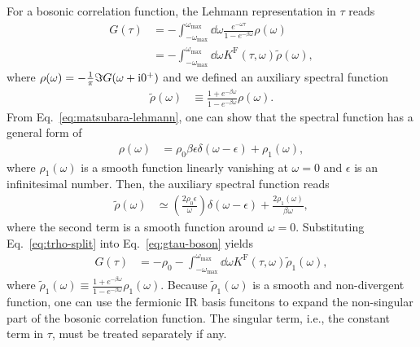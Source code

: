 \documentclass[submission, LectureNotes]{SciPost}
\newcommand{\wmax}{\ensuremath{{\omega_\mathrm{max}}}}
\newcommand\ii{\mathrm{i}}%
\newcommand{\KF}{\ensuremath{K^\mathrm{F}}}
\begin{document}
For a bosonic correlation function, the Lehmann representation in $\tau$ reads
\begin{align}
    G(\tau) &= - \int_{-\wmax}^\wmax \dd \omega \frac{e^{-\omega\tau}}{1-e^{-\beta\omega}} \rho(\omega)\nonumber\\
    &= -  \int_{-\wmax}^\wmax \dd\omega \KF(\tau, \omega) \tilde \rho(\omega),\label{eq:gtau-boson}
\end{align}
where $\rho(\omega) = - \frac{1}{\pi}\imaginary G(\omega+\ii 0^+)$ and we defined an auxiliary spectral function
\begin{align}
    \tilde \rho(\omega) &\equiv \frac{1+e^{-\beta\omega}}{1-e^{-\beta \omega}} \rho(\omega).
\end{align}
From Eq.~\eqref{eq:matsubara-lehmann}, one can show that the spectral function has a general form of
\begin{align}
   \rho(\omega) &= \rho_0\beta\epsilon \delta(\omega - \epsilon) + \rho_1(\omega),\label{eq:rho-split}
\end{align}
where $\rho_1(\omega)$ is a smooth function linearly vanishing at $\omega=0$ and $\epsilon$ is an infinitesimal number.
Then, the auxiliary spectral function reads
\begin{align}
   \tilde \rho(\omega) &\simeq \left(\frac{2\rho_0\epsilon}{\omega}\right) \delta(\omega-\epsilon) + \frac{2\rho_1(\omega)}{\beta\omega},\label{eq:trho-split}
\end{align}
where the second term is a smooth function around $\omega=0$.
Substituting Eq.~\eqref{eq:trho-split} into Eq.~\eqref{eq:gtau-boson} yields
\begin{align}
    G(\tau) &= -\rho_0 - \int_{-\wmax}^\wmax \dd\omega \KF(\tau, \omega) \tilde \rho_1(\omega),\label{eq:gtau-boson-split}
\end{align}
where $\tilde \rho_1(\omega) \equiv \frac{1+e^{-\beta\omega}}{1-e^{-\beta\omega}} \rho_1(\omega)$.
Because $\tilde \rho_1(\omega)$ is a smooth and non-divergent function, one can use the fermionic IR basis funcitons
to expand the non-singular part of the bosonic correlation function.
The singular term, i.e., the constant term in $\tau$, must be treated separately if any.
\end{document}

